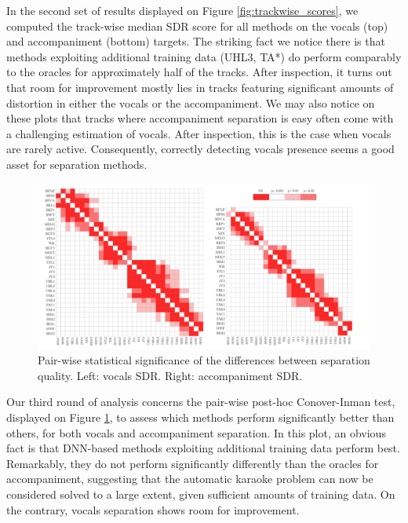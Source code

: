 \documentclass{article}
\begin{document}
In the second set of results displayed on Figure \ref{fig:trackwise_scores}, we computed the track-wise median SDR score for all methods on the vocals (top) and accompaniment (bottom) targets. The striking fact we notice there is that methods exploiting additional training data (UHL3, TA*) do perform comparably to the oracles for approximately half of the tracks. After inspection, it turns out that room for improvement mostly lies in tracks featuring significant amounts of distortion in either the vocals or the accompaniment. We may also notice on these plots that tracks where accompaniment separation is easy often come with a challenging estimation of vocals. After inspection, this is the case when vocals are rarely active. Consequently, correctly detecting vocals presence seems a good asset for separation methods.

\begin{figure}[h]
  \begin{center}
     \includegraphics[width=1\linewidth]{fig/pairwise.pdf}
     \vspace{-1cm}
  \end{center}
  \caption{Pair-wise statistical significance of the differences between separation quality. Left: vocals SDR. Right: accompaniment SDR.}
  \label{fig:pairwise_matrix}
\end{figure}

Our third round of analysis concerns the pair-wise post-hoc Conover-Inman test, displayed on Figure \ref{fig:pairwise_matrix}, to assess which methods perform significantly better than others, for both vocals and accompaniment separation. In this plot, an obvious fact is that DNN-based methods exploiting additional training data perform best. Remarkably, they do not perform significantly differently than the oracles for accompaniment, suggesting that the automatic karaoke problem can now be considered solved to a large extent, given sufficient amounts of training data. On the contrary, vocals separation shows room for improvement.
\end{document}
